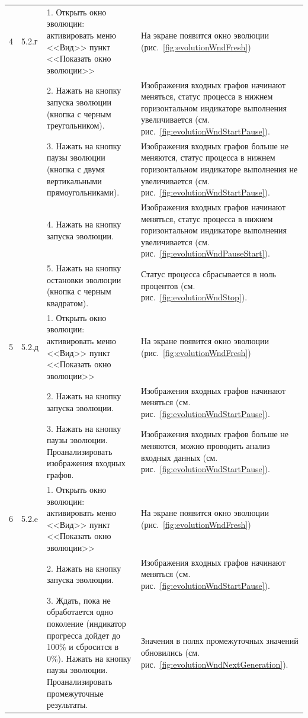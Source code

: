 \documentclass[russian,utf8,emptystyle]{eskdtext}
\begin{document}
\begin{longtable}{
  p{0.7cm}|p{1.5cm}|p{6.5cm}|p{6.5cm}
}
4 & 5.2.г & 1. Открыть окно эволюции: активировать меню <<Вид>> пункт <<Показать окно эволюции>> & На экране появится окно эволюции (рис.~\ref{fig:evolutionWndFresh})\\
\cline{3-4}
  &       & 2. Нажать на кнопку запуска эволюции (кнопка с черным треугольником). & Изображения входных графов начинают меняться, статус процесса в нижнем горизонтальном индикаторе выполнения увеличивается (см. рис.~\ref{fig:evolutionWndStartPause}). \\
\cline{3-4}
  &       & 3. Нажать на кнопку паузы эволюции (кнопка с двумя вертикальными прямоугольниками). & Изображения входных графов больше не меняются, статус процесса в нижнем горизонтальном индикаторе выполнения не увеличивается (см. рис.~\ref{fig:evolutionWndStartPause}). \\
\cline{3-4}  
  &       & 4. Нажать на кнопку запуска эволюции. & Изображения входных графов начинают меняться, статус процесса в нижнем горизонтальном индикаторе выполнения увеличивается (см. рис.~\ref{fig:evolutionWndPauseStart}). \\
\cline{3-4} 
  &       & 5. Нажать на кнопку остановки эволюции (кнопка с черным квадратом). & Статус процесса сбрасывается в ноль процентов (см. рис.~\ref{fig:evolutionWndStop}). \\
\hline

5 & 5.2.д & 1. Открыть окно эволюции: активировать меню <<Вид>> пункт <<Показать окно эволюции>> & На экране появится окно эволюции (рис.~\ref{fig:evolutionWndFresh})\\
\cline{3-4}
  &       & 2. Нажать на кнопку запуска эволюции. & Изображения входных графов начинают меняться (см. рис.~\ref{fig:evolutionWndStartPause}). \\
\cline{3-4}
  &       & 3. Нажать на кнопку паузы эволюции. Проанализировать изображения входных графов. & Изображения входных графов больше не меняются, можно проводить анализ входных данных (см. рис.~\ref{fig:evolutionWndStartPause}). \\
\hline

6 & 5.2.e & 1. Открыть окно эволюции: активировать меню <<Вид>> пункт <<Показать окно эволюции>> & На экране появится окно эволюции (рис.~\ref{fig:evolutionWndFresh})\\
\cline{3-4}
  &       & 2. Нажать на кнопку запуска эволюции. & Изображения входных графов начинают меняться (см. рис.~\ref{fig:evolutionWndStartPause}). \\
\cline{3-4}
  &       & 3. Ждать, пока не обработается одно поколение (индикатор прогресса дойдет до 100\% и сбросится в 0\%). Нажать на кнопку паузы эволюции. Проанализировать промежуточные результаты. & Значения в полях промежуточных значений обновились (см. рис.~\ref{fig:evolutionWndNextGeneration}). \\
\hline


\end{longtable}
\end{document}
